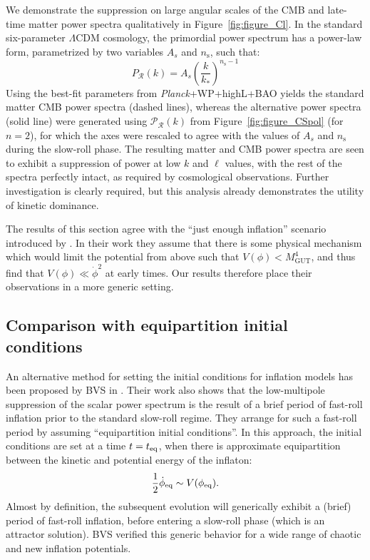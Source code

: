 We demonstrate the suppression on large angular scales of the CMB and late-time matter power spectra qualitatively in Figure~\ref{fig:figure_Cl}.  In the standard six-parameter \(\Lambda\)CDM cosmology, the primordial power spectrum has a power-law form, parametrized by two variables \(A_s\) and \(n_\mathrm{s}\), such that:
%
\begin{equation}
  P_\mathcal{R}(k) = A_s{\left(\frac{k}{k_*}\right)}^{n_\mathrm{s}-1}
\end{equation}
%
Using the best-fit parameters from {\em Planck\/}+WP+highL+BAO \citep{planck_collaboration_planck_2013} yields the standard matter CMB power spectra (dashed lines), whereas the alternative power spectra (solid line) were generated using \(\mathcal{P}_\mathcal{R}(k)\) from Figure~\ref{fig:figure_CSpol} (for \(n=2\)), for which the axes were rescaled to agree with the values of \(A_s\) and \(n_\mathrm{s}\) during the slow-roll phase. The resulting matter and CMB power spectra are seen to exhibit a suppression of power at low \(k\) and \(\ell\) values, with the rest of the spectra perfectly intact, as required by cosmological observations.  Further investigation is clearly required, but this analysis already demonstrates the utility of kinetic dominance.

The results of this section agree with the ``just enough inflation'' scenario introduced by \citet{Ramirez_excluded_2009,Ramirez_predictions_2012,Ramirez_low_2012}.  In their work they assume that there is some physical mechanism which would limit the potential from above such that \(V(\phi)<M_\mathrm{GUT}^4\), and thus find that \(V(\phi)\ll\dot{\phi}^2\) at early times. Our results therefore place their observations in a more generic setting.


\subsection{Comparison with equipartition initial conditions}
\label{sec:comparison}

An alternative method for setting the initial conditions for inflation models has been proposed by BVS in \citep{boyanovsky_cmb_2006}. Their work also shows that the low-multipole suppression of the scalar power spectrum is the result of a brief period of fast-roll inflation prior to the standard slow-roll regime. They arrange for such a fast-roll period by assuming ``equipartition initial conditions''. In this approach, the initial conditions are set at a time \(t=t_{\mathrm{eq}}\), when there is approximate equipartition between the kinetic and potential energy of the inflaton:
%
\begin{equation}
  \frac{1}{2}\dot{\phi}_{\mathrm{eq}} \sim V(\phi_{\mathrm{eq}}).
  \label{eqn:bvsbc}
\end{equation}
%
Almost by definition, the subsequent evolution will generically exhibit a (brief) period of fast-roll inflation, before entering a slow-roll phase (which is an attractor solution). BVS verified this generic behavior for a wide range of chaotic and new inflation potentials.

